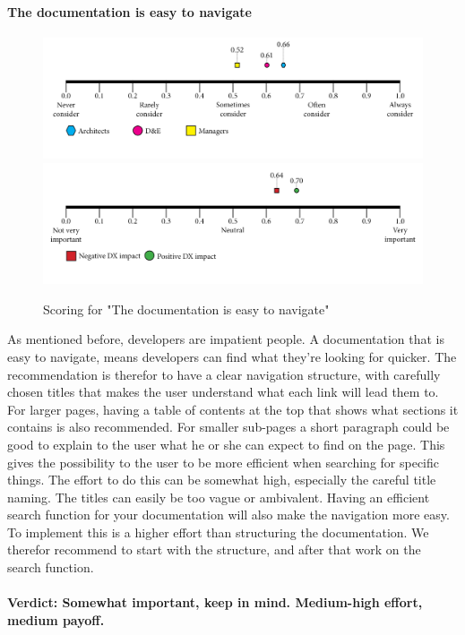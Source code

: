 \documentclass{article}
\begin{document}
\paragraph{The documentation is easy to navigate}
\begin{figure}[H]
\centering
\includegraphics[width=\linewidth]{scorelines/aspect7.png}
\includegraphics[width=\linewidth]{dxscorelines/dxaspect7.png}
\caption{Scoring for "The documentation is easy to navigate"}
\label{fig:aspect7}
\end{figure}
As mentioned before, developers are impatient people. A documentation that is easy to navigate, means developers can find what they're looking for quicker. The recommendation is therefor to have a clear navigation structure, with carefully chosen titles that makes the user understand what each link will lead them to. For larger pages, having a table of contents at the top that shows what sections it contains is also recommended. For smaller sub-pages a short paragraph could be good to explain to the user what he or she can expect to find on the page. This gives the possibility to the user to be more efficient when searching for specific things. The effort to do this can be somewhat high, especially the careful title naming. The titles can easily be too vague or ambivalent. Having an efficient search function for your documentation will also make the navigation more easy. To implement this is a higher effort than structuring the documentation. We therefor recommend to start with the structure, and after that work on the search function. \\ \\
\textbf{Verdict: Somewhat important, keep in mind. Medium-high effort, medium payoff.}
\end{document}
